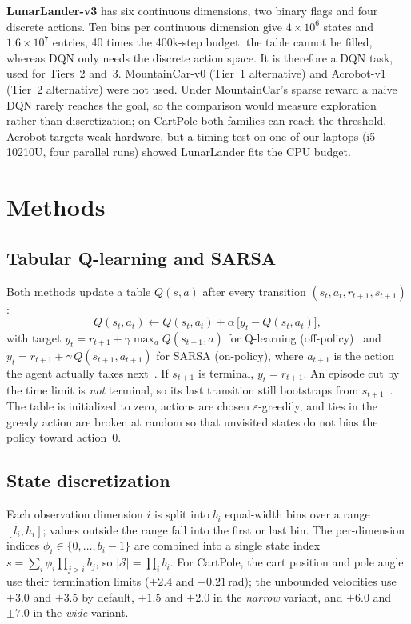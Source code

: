 \documentclass[conference]{IEEEtran}
\begin{document}
\textbf{LunarLander-v3} has six continuous dimensions, two binary flags and four discrete
actions. Ten bins per continuous dimension give $4\times10^6$ states and $1.6\times10^7$
entries, 40 times the 400k-step budget: the table cannot be filled, whereas DQN only needs
the discrete action space. It is therefore a DQN task, used for Tiers~2 and~3.
MountainCar-v0 (Tier~1 alternative) and Acrobot-v1 (Tier~2 alternative) were not used.
Under MountainCar's sparse reward a naive DQN rarely reaches the goal, so the comparison
would measure exploration rather than discretization; on CartPole both families can reach
the threshold. Acrobot targets weak hardware, but a timing test on one of our laptops
(i5-10210U, four parallel runs) showed LunarLander fits the CPU budget.

\section{Methods}\label{sec:methods}

\subsection{Tabular Q-learning and SARSA}
Both methods update a table $Q(s,a)$ after every transition $(s_t,a_t,r_{t+1},s_{t+1})$:
\begin{equation}
Q(s_t,a_t) \leftarrow Q(s_t,a_t) + \alpha\,\bigl[y_t - Q(s_t,a_t)\bigr],
\end{equation}
with target $y_t = r_{t+1} + \gamma \max_{a} Q(s_{t+1},a)$ for Q-learning
(off-policy)~\cite{watkins1992} and $y_t = r_{t+1} + \gamma\,Q(s_{t+1},a_{t+1})$ for SARSA
(on-policy), where $a_{t+1}$ is the action the agent actually takes
next~\cite{rummery1994}. If $s_{t+1}$ is terminal, $y_t = r_{t+1}$. An episode cut by the
time limit is \emph{not} terminal, so its last transition still bootstraps from
$s_{t+1}$~\cite{pardo2018}. The table is initialized to zero, actions are chosen
$\varepsilon$-greedily, and ties in the greedy action are broken at random so that
unvisited states do not bias the policy toward action~0.

\subsection{State discretization}
Each observation dimension $i$ is split into $b_i$ equal-width bins over a range
$[l_i,h_i]$; values outside the range fall into the first or last bin. The per-dimension
indices $\phi_i \in \{0,\dots,b_i-1\}$ are combined into a single state index
$s = \sum_i \phi_i \prod_{j>i} b_j$, so $|\mathcal{S}| = \prod_i b_i$. For CartPole, the
cart position and pole angle use their termination limits ($\pm2.4$ and $\pm0.21$\,rad);
the unbounded velocities use $\pm3.0$ and $\pm3.5$ by default, $\pm1.5$ and $\pm2.0$ in
the \emph{narrow} variant, and $\pm6.0$ and $\pm7.0$ in the \emph{wide} variant.
\end{document}
